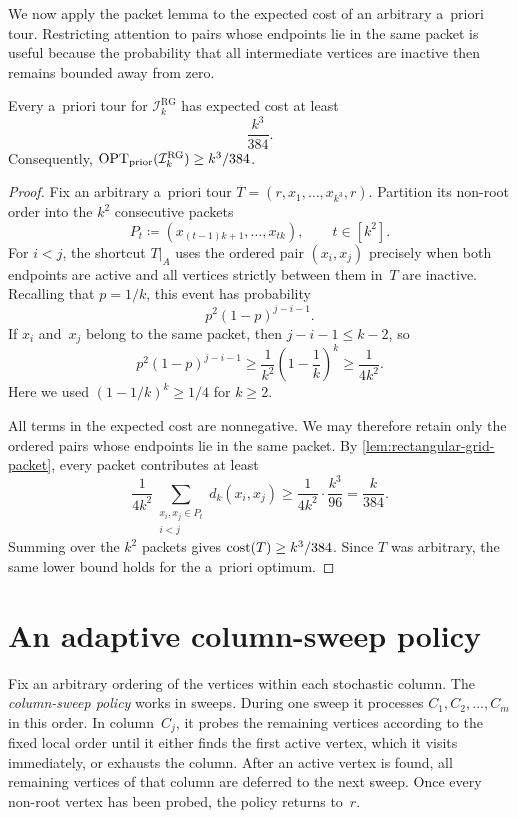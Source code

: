 \documentclass[12pt,a4paper,oneside]{report}
\begin{document}
We now apply the packet lemma to the expected cost of an arbitrary a~priori
tour.  Restricting attention to pairs whose endpoints lie in the same packet
is useful because the probability that all intermediate vertices are inactive
then remains bounded away from zero.

\begin{lemma}\label{lem:rectangular-grid-prior}
Every a~priori tour for $\mathcal I_k^{\mathrm{RG}}$ has expected cost at
least
\[
    \frac{k^3}{384}.
\]
Consequently, $\operatorname{OPT}_\mathrm{prior}(\mathcal I_k^{\mathrm{RG}})\ge k^3/384$.
\end{lemma}

\begin{proof}
Fix an arbitrary a~priori tour
$T=(r,x_1,\ldots,x_{k^3},r)$.
Partition its non-root order into the $k^2$ consecutive packets
\[
    P_t
    \coloneqq(x_{(t-1)k+1},\ldots,x_{tk}),
    \qquad t\in[k^2].
\]
For $i<j$, the shortcut $T|_A$ uses the ordered pair $(x_i,x_j)$ precisely
when both endpoints are active and all vertices strictly between them in~$T$
are inactive.  Recalling that $p=1/k$, this event has probability
\[
    p^2(1-p)^{j-i-1}.
\]
If $x_i$ and~$x_j$ belong to the same packet, then $j-i-1\le k-2$, so
\[
    p^2(1-p)^{j-i-1}
    \ge
    \frac1{k^2}\left(1-\frac1k\right)^k
    \ge
    \frac1{4k^2}.
\]
Here we used $(1-1/k)^k\ge1/4$ for $k\ge2$.

All terms in the expected cost are nonnegative.  We may therefore retain
only the ordered pairs whose endpoints lie in the same packet.  By
\cref{lem:rectangular-grid-packet}, every packet contributes at least
\[
    \frac1{4k^2}
    \sum_{\substack{x_i,x_j\in P_t\\i<j}}d_k(x_i,x_j)
    \ge
    \frac1{4k^2}\cdot\frac{k^3}{96}
    =\frac{k}{384}.
\]
Summing over the $k^2$ packets gives $\operatorname{cost}(T)\ge k^3/384$.  Since $T$ was
arbitrary, the same lower bound holds for the a~priori optimum.
\end{proof}

\section{An adaptive column-sweep policy}
\label{sec:asym-adapt-policy}

Fix an arbitrary ordering of the vertices within each stochastic column.  The
\emph{column-sweep policy} works in sweeps.  During one sweep it processes
$C_1,C_2,\ldots,C_m$ in this order.  In column~$C_j$, it probes the remaining
vertices according to the fixed local order until it either finds the first
active vertex, which it visits immediately, or exhausts the column.  After an
active vertex is found, all remaining vertices of that column are deferred to
the next sweep.  Once every non-root vertex has been probed, the policy
returns to~$r$.
\end{document}
